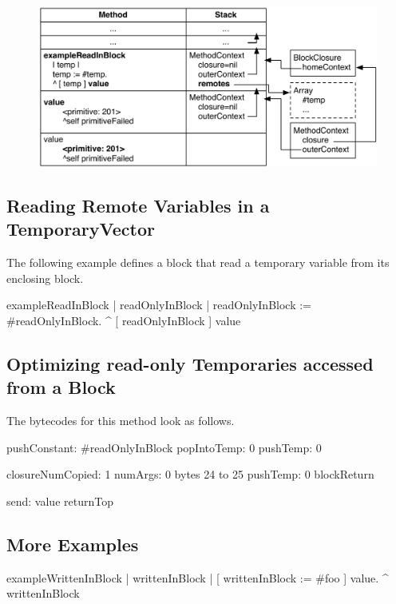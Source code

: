 \documentclass[a4paper,10pt,twoside]{book}
\begin{document}
\begin{figure}[H]
\begin{center}
\includegraphics[width=12cm]{BlockWithMethodContext}
\end{center}
\end{figure}



\subsection{Reading Remote Variables in a TemporaryVector}
The following example defines a block that read a temporary variable from its enclosing block.
\begin{code}{}
exampleReadInBlock
    | readOnlyInBlock |
    readOnlyInBlock := #readOnlyInBlock.
    ^ [ readOnlyInBlock ] value
\end{code}



\subsection{Optimizing read-only Temporaries accessed from a Block}
The bytecodes for this method look as follows.
\begin{code}{}
pushConstant: #readOnlyInBlock
popIntoTemp: 0
pushTemp: 0

closureNumCopied: 1 numArgs: 0 bytes 24 to 25
pushTemp: 0
blockReturn

send: value
returnTop
\end{code}


\subsection{More Examples}
\begin{code}{}
exampleWrittenInBlock
    | writtenInBlock |
    [ writtenInBlock := #foo ] value.
    ^ writtenInBlock
\end{code}
\end{document}
